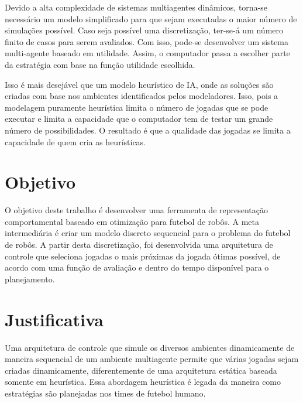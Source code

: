 Devido a alta complexidade de sistemas multiagentes dinâmicos, torna-se
necessário um modelo simplificado para que sejam executadas o maior número de
simulações possível.  Caso seja possível uma discretização, ter-se-á um número
finito de casos para serem avaliados. Com isso, pode-se desenvolver um sistema
multi-agente baseado em utilidade. Assim, o computador passa a escolher parte
da estratégia com base na função utilidade escolhida.

Isso é mais desejável que um modelo heurístico de IA, onde as soluções são
criadas com base nos ambientes identificados pelos modeladores. Isso, pois a
modelagem puramente heurística limita o número de jogadas que se pode executar e
limita a capacidade que o computador tem de testar um grande número de possibilidades.
O resultado é que a qualidade das jogadas se limita a capacidade de quem cria as
heurísticas.

\section{Objetivo}

O objetivo deste trabalho é desenvolver uma ferramenta de representação
comportamental baseado em otimização para futebol de robôs.
A meta intermediária é criar um modelo discreto sequencial
para o problema do futebol de robôs. A partir desta
discretização, foi desenvolvida uma arquitetura de controle
que seleciona jogadas o mais próximas da jogada ótimas possível,
de acordo com uma função de avaliação e dentro do tempo disponível
para o planejamento.

\section{Justificativa}

Uma arquitetura de controle que simule os diversos ambientes dinamicamente de
maneira sequencial de um ambiente multiagente permite que várias jogadas sejam
criadas dinamicamente, diferentemente de uma arquitetura estática baseada somente
em heurística. Essa abordagem heurística é legada da maneira como estratégias
são planejadas nos times de futebol humano.

